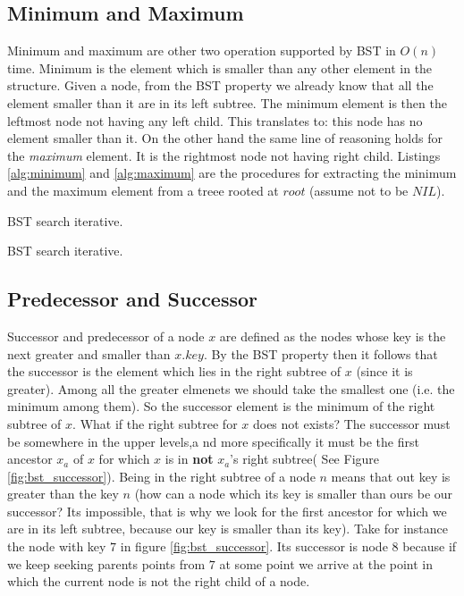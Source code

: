 \subsection{Minimum and Maximum}
Minimum and maximum are other two operation supported by BST in $O(n)$ time.
Minimum is the element which is smaller than any other element in the structure. Given a node, from the BST property we already know that all the element smaller than it are in its left subtree.
The minimum element is then the leftmost node not having any left child. This translates to: this node has no element smaller than it.
On the other hand the same line of reasoning holds for the \textit{maximum} element. It is the rightmost node not having right child. Listings \ref{alg:minimum} and \ref{alg:maximum} are the procedures for extracting the minimum and the maximum element from a treee rooted at $root$ (assume not to be $NIL$).

\begin{algorithm}
\caption{BST search iterative.}\label{alg:minimum}
\end{algorithm}

\begin{algorithm}
\caption{BST search iterative.}\label{alg:minimum}
\end{algorithm}

\subsection{Predecessor and Successor}
Successor and predecessor of a node $x$ are defined as the nodes whose key is the next greater and smaller than $x.key$.
By the BST property then it follows that the successor is the element which lies in the right subtree of $x$ (since it is greater). Among all the greater elmenets we should take the smallest one (i.e. the minimum among them). So the successor element is the minimum of the right subtree of $x$. What if the right subtree for $x$ does not exists? The successor must be somewhere in the upper levels,a nd more specifically it must be the first ancestor $x_a$ of $x$ for which $x$ is in \textbf{not} $x_a$'s right subtree( See Figure \ref{fig:bst_successor}). Being in the right subtree of a node $n$ means that out key is greater than the key $n$ (how can a node which its key is smaller than ours be our successor? Its impossible, that is why we look for the first ancestor for which we are in its left subtree, because our key is smaller than its key).
Take for instance the node with key $7$ in figure \ref{fig:bst_successor}. Its successor is node $8$ because if we keep seeking parents points from $7$ at some point we arrive at the point in which the current node is not the right child of a node.

